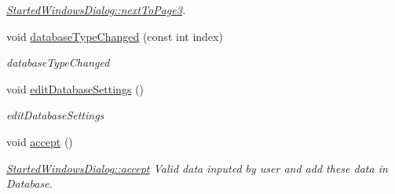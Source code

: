 \begin{DoxyCompactItemize}
\begin{DoxyCompactList}\small\item\em \hyperlink{classGui_1_1Dialogs_1_1StartedWindowsDialog_abac16c4f9fc0a3481565530fa01d8494}{Started\-Windows\-Dialog\-::next\-To\-Page3}. \end{DoxyCompactList}\item 
void \hyperlink{classGui_1_1Dialogs_1_1StartedWindowsDialog_a2e11f7b179785e86a86294d2d2d5357f}{database\-Type\-Changed} (const int index)
\begin{DoxyCompactList}\small\item\em database\-Type\-Changed \end{DoxyCompactList}\item 
\hypertarget{classGui_1_1Dialogs_1_1StartedWindowsDialog_aba72847520dfee250c606b0125c188b7}{void \hyperlink{classGui_1_1Dialogs_1_1StartedWindowsDialog_aba72847520dfee250c606b0125c188b7}{edit\-Database\-Settings} ()}\label{classGui_1_1Dialogs_1_1StartedWindowsDialog_aba72847520dfee250c606b0125c188b7}

\begin{DoxyCompactList}\small\item\em edit\-Database\-Settings \end{DoxyCompactList}\item 
\hypertarget{classGui_1_1Dialogs_1_1StartedWindowsDialog_aa5da70f656530017906b5aa974fbc080}{void \hyperlink{classGui_1_1Dialogs_1_1StartedWindowsDialog_aa5da70f656530017906b5aa974fbc080}{accept} ()}\label{classGui_1_1Dialogs_1_1StartedWindowsDialog_aa5da70f656530017906b5aa974fbc080}

\begin{DoxyCompactList}\small\item\em \hyperlink{classGui_1_1Dialogs_1_1StartedWindowsDialog_aa5da70f656530017906b5aa974fbc080}{Started\-Windows\-Dialog\-::accept} Valid data inputed by user and add these data in Database. \end{DoxyCompactList}\end{DoxyCompactItemize}
